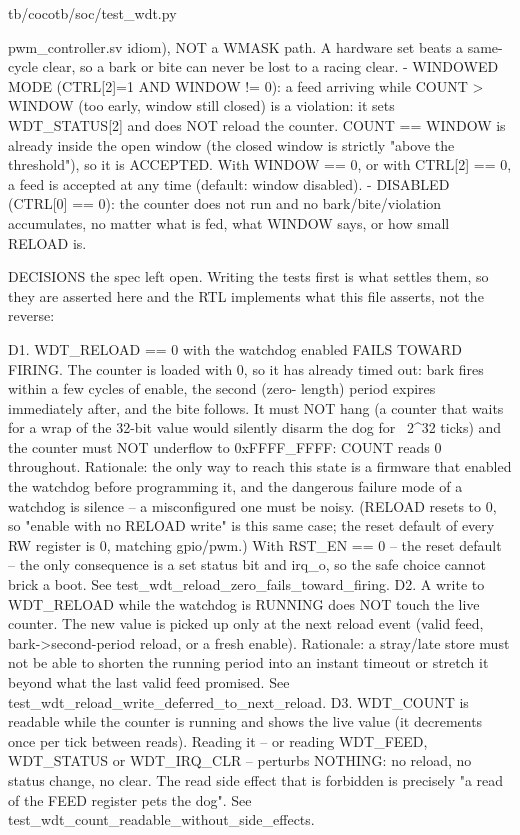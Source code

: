 \begin{relocated}{tb/cocotb/soc/test_wdt.py}
\begin{textblock}
pwm_controller.sv idiom), NOT a WMASK path. A hardware set beats a same-cycle clear, so a
bark or bite can never be lost to a racing clear.
- WINDOWED MODE (CTRL[2]=1 AND WINDOW != 0): a feed arriving while COUNT > WINDOW (too early,
window still closed) is a violation: it sets WDT_STATUS[2] and does NOT reload the counter.
COUNT == WINDOW is already inside the open window (the closed window is strictly "above the
threshold"), so it is ACCEPTED. With WINDOW == 0, or with CTRL[2] == 0, a feed is accepted at
any time (default: window disabled).
- DISABLED (CTRL[0] == 0): the counter does not run and no bark/bite/violation accumulates,
no matter what is fed, what WINDOW says, or how small RELOAD is.

DECISIONS the spec left open. Writing the tests first is what settles them, so they are asserted
here and the RTL implements what this file asserts, not the reverse:

D1. WDT_RELOAD == 0 with the watchdog enabled FAILS TOWARD FIRING. The counter is loaded with 0,
so it has already timed out: bark fires within a few cycles of enable, the second (zero-
length) period expires immediately after, and the bite follows. It must NOT hang (a counter
that waits for a wrap of the 32-bit value would silently disarm the dog for ~2^32 ticks) and
the counter must NOT underflow to 0xFFFF_FFFF: COUNT reads 0 throughout. Rationale: the only
way to reach this state is a firmware that enabled the watchdog before programming it, and
the dangerous failure mode of a watchdog is silence -- a misconfigured one must be noisy.
(RELOAD resets to 0, so "enable with no RELOAD write" is this same case; the reset default
of every RW register is 0, matching gpio/pwm.) With RST_EN == 0 -- the reset default --
the only consequence is a set status bit and irq_o, so the safe choice cannot brick a boot.
See test_wdt_reload_zero_fails_toward_firing.
D2. A write to WDT_RELOAD while the watchdog is RUNNING does NOT touch the live counter. The new
value is picked up only at the next reload event (valid feed, bark->second-period reload,
or a fresh enable). Rationale: a stray/late store must not be able to shorten the running
period into an instant timeout or stretch it beyond what the last valid feed promised.
See test_wdt_reload_write_deferred_to_next_reload.
D3. WDT_COUNT is readable while the counter is running and shows the live value (it decrements
once per tick between reads). Reading it -- or reading WDT_FEED, WDT_STATUS or WDT_IRQ_CLR
-- perturbs NOTHING: no reload, no status change, no clear. The read side effect that is
forbidden is precisely "a read of the FEED register pets the dog".
See test_wdt_count_readable_without_side_effects.


\end{textblock}
\end{relocated}
